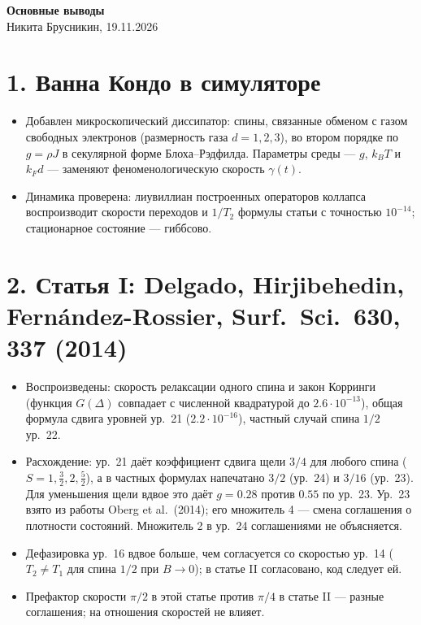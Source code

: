 \documentclass[11pt,a4paper]{article}
\begin{document}
\begin{center}
{\Large\bfseries Основные выводы}\\[4pt]
Никита Брусникин, 19.11.2026
\end{center}

\section*{1. Ванна Кондо в симуляторе}
\begin{itemize}
\item Добавлен микроскопический диссипатор: спины, связанные обменом с газом
  свободных электронов (размерность газа $d=1,2,3$), во втором порядке по
  $g=\rho J$ в секулярной форме Блоха--Рэдфилда. Параметры среды --- $g$,
  $k_BT$ и $k_Fd$ --- заменяют феноменологическую скорость $\gamma(t)$.
\item Динамика проверена: лиувиллиан построенных операторов коллапса
  воспроизводит скорости переходов и $1/T_2$ формулы статьи с точностью
  $10^{-14}$; стационарное состояние --- гиббсово.
\end{itemize}

\section*{2. Статья I: Delgado, Hirjibehedin, Fern\'andez-Rossier, Surf.\ Sci.\ 630, 337 (2014)}
\begin{itemize}
\item Воспроизведены: скорость релаксации одного спина и закон Корринги
  (функция $G(\Delta)$ совпадает с численной квадратурой до
  $2.6\cdot10^{-13}$), общая формула сдвига уровней ур.~21 ($2.2\cdot10^{-16}$),
  частный случай спина $1/2$ ур.~22.
\item Расхождение: ур.~21 даёт коэффициент сдвига щели $3/4$ для любого спина
  ($S=1,\tfrac32,2,\tfrac52$), а в частных формулах напечатано $3/2$ (ур.~24)
  и $3/16$ (ур.~23). Для уменьшения щели вдвое это даёт $g=0.28$ против
  $0.55$ по ур.~23. Ур.~23 взято из работы Oberg et al.\ (2014); его множитель 4
  --- смена соглашения о плотности состояний. Множитель 2 в ур.~24
  соглашениями не объясняется.
\item Дефазировка ур.~16 вдвое больше, чем согласуется со скоростью ур.~14
  ($T_2\ne T_1$ для спина $1/2$ при $B\to0$); в статье II согласовано, код
  следует ей.
\item Префактор скорости $\pi/2$ в этой статье против $\pi/4$ в статье II ---
  разные соглашения; на отношения скоростей не влияет.
\end{itemize}
\end{document}

